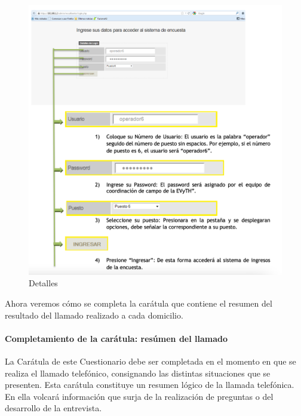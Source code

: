 \documentclass[
  openany]{book}
\begin{document}
\begin{figure}

{\centering \includegraphics[width=1\linewidth]{imagenes/figura6-23} 

}

\caption{Detalles}\label{fig:detal}
\end{figure}

Ahora veremos cómo se completa la carátula que contiene el resumen del resultado del llamado realizado a cada domicilio.

\hypertarget{completamiento-de-la-caruxe1tula-resuxfamen-del-llamado}{%
\paragraph{Completamiento de la carátula: resúmen del llamado}\label{completamiento-de-la-caruxe1tula-resuxfamen-del-llamado}}

La Carátula de este Cuestionario debe ser completada en el momento en que se realiza el llamado telefónico, consignando las distintas situaciones que se presenten. Esta carátula constituye un resumen lógico de la llamada telefónica. En ella volcará información que surja de la realización de preguntas o del desarrollo de la entrevista.
\end{document}
